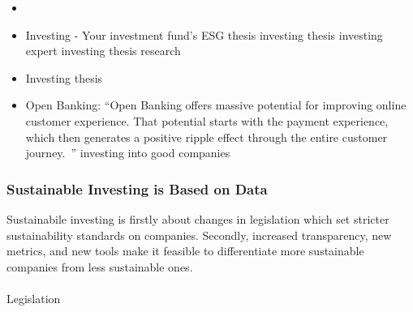 \documentclass[
  letterpaper,
  DIV=11,
  numbers=noendperiod]{scrartcl}
\makeatletter
\let\oldparagraph\paragraph
\renewcommand{\paragraph}{
    \@ifstar
      \xxxParagraphStar
      \xxxParagraphNoStar
  }
\newcommand{\xxxParagraphStar}[1]{\oldparagraph*{#1}\mbox{}}
\newcommand{\xxxParagraphNoStar}[1]{\oldparagraph{#1}\mbox{}}
\makeatother
\begin{document}
\begin{itemize}
\item
  \citet{hankewitzEstonianFintechCompany2021}
\item
  Investing - Your investment fund's ESG thesis investing thesis
  investing expert investing thesis research
\item
  Investing thesis
\item
  Open Banking: ``Open Banking offers massive potential for improving
  online customer experience. That potential starts with the payment
  experience, which then generates a positive ripple effect through the
  entire customer journey.~'' investing into good companies
\end{itemize}

\subsubsection{Sustainable Investing is Based on
Data}\label{sustainable-investing-is-based-on-data}

Sustainabile investing is firstly about changes in legislation which set
stricter sustainability standards on companies. Secondly, increased
transparency, new metrics, and new tools make it feasible to
differentiate more sustainable companies from less sustainable ones.

\paragraph{Legislation}\label{legislation}
\end{document}
